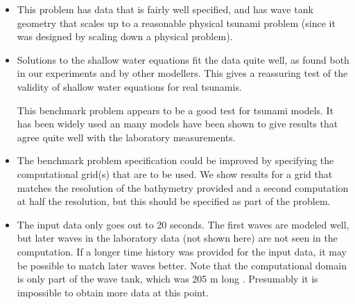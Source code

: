 \begin{itemize}
\item This problem has data that is fairly well specified, and has wave tank
geometry that scales up to a reasonable physical tsunami problem (since it
was designed by scaling down a physical problem).  

\item Solutions to the shallow water equations fit the data quite well, as
found both in our experiments and by other modellers.  This gives a
reassuring test of the validity of shallow water equations for real
tsunamis.

This benchmark problem appears to be a good test for tsunami models.  It has
been widely used an many models have been shown to give results that agree
quite well with the laboratory measurements.

\item The benchmark problem specification could be improved by specifying the
computational grid(s) that are to be used.  We show results for a grid that
matches the resolution of the bathymetry provided and a second computation
at half the resolution, but this should be specified as part of the problem.

\item The input data only goes out to 20 seconds.
The first waves are modeled well, but later waves  in the laboratory data
(not shown here) are not seen in the
computation.  If a longer time history was provided for the input data, it
may be possible to match later waves better.  Note that the computational
domain is only part of the wave tank, which was 205 m long
\cite{MatsuyamaTanaka:monai}.
Presumably it is impossible to obtain more data at this point.


\end{itemize} 
